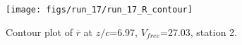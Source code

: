 \begin{figure}[H]
\centering
\texttt{[image: figs/run\_17/run\_17\_R\_contour]}
\caption{Contour plot of $\overline{r}$ at $z/c$=6.97, $V_{free}$=27.03, station 2.}
\label{fig:run_17_R_contour}
\end{figure}


